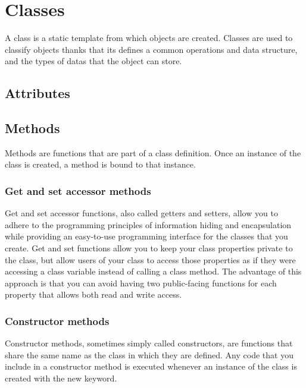 \section{Classes}

A class is a static 
template from which objects are 
created. Classes are used 
to classify objects thanks 
that its defines a 
common operations 
and data structure, 
and the types of 
datas that the object can 
store.


\subsection{Attributes}

\subsection{Methods}
Methods are functions that are part of a class 
definition. Once an instance of the class is created, 
a method is bound to that instance.

	\subsubsection{Get and set accessor methods}
	Get and set accessor functions, also called getters 
	and setters, allow you to adhere to the programming principles of 
	information hiding and encapsulation while providing an 
	easy-to-use programming interface for the classes that you 
	create. Get and set functions allow you to keep your class 
	properties private to the class, but allow users of your class 
	to access those properties as if they were accessing a 
	class variable instead of calling a class method. 
	The advantage of this approach is that you can avoid 
	having two public-facing functions for each property 
	that allows both read and write access.
	
	\subsubsection{Constructor methods}
	Constructor methods, sometimes simply called constructors, 
	are functions that share the same name as the class in 
	which they are defined. Any code that you include in 
	a constructor method is executed whenever an instance of the 
	class is created with the  new  keyword.
